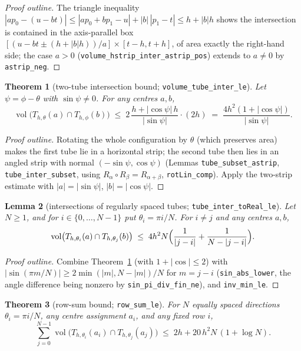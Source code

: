 \documentclass[11pt,a4paper]{article}
\newcommand{\vol}{\operatorname{vol}}                %
\newcommand{\tube}{T}                                %
\newcommand{\lname}[1]{\texttt{#1}}                  %
\newcommand{\lb}{\_\allowbreak}                      %
\newtheorem{theorem}{Theorem}[section]
\newtheorem{lemma}[theorem]{Lemma}
\theoremstyle{definition}
\theoremstyle{remark}
\begin{document}
\begin{proof}[Proof outline]
The triangle inequality $|a p_0-(u-bt)|\le |a p_0 + b p_1 - u| + |b|\,|p_1 - t|
\le h+|b|h$ shows the intersection is contained in the axis-parallel box
$[(u-bt\pm(h+|b|h))/a]\times[t-h,t+h]$, of area exactly the right-hand side; the case
$a>0$ (\lname{volume\_hstrip\_inter\_astrip\_pos}) extends to $a\ne0$ by
\lname{astrip\_neg}.
\end{proof}

\begin{theorem}[{two-tube intersection bound; \lname{volume\_tube\_inter\_le}}]
\label{thm:two-tube}
Let $\psi=\phi-\theta$ with $\sin\psi\neq0$.  For any centres $a,b$,
\[
  \vol\bigl(\tube_{h,\theta}(a)\cap \tube_{h,\phi}(b)\bigr)
  \;\le\; 2\,\frac{h+|\cos\psi|\,h}{|\sin\psi|}\cdot(2h)
  \;=\; \frac{4h^2(1+|\cos\psi|)}{|\sin\psi|}.
\]
\end{theorem}

\begin{proof}[Proof outline]
Rotating the whole configuration by $\theta$ (which preserves area) makes the first tube
lie in a horizontal strip; the second tube then lies in an angled strip with normal
$(-\sin\psi,\cos\psi)$ (Lemmas \lname{tube\_subset\_astrip},
\lname{tube\_inter\_subset}, using $R_\alpha\circ R_\beta = R_{\alpha+\beta}$,
\lname{rotLin\_comp}).  Apply the two-strip estimate with $|a|=|\sin\psi|$,
$|b|=|\cos\psi|$.
\end{proof}

\begin{lemma}[{intersections of regularly spaced tubes; \lname{tube\_inter\_toReal\_le}}]
\label{lem:tube-inter-real}
Let $N\ge1$, and for $i\in\{0,\dots,N-1\}$ put $\theta_i=\pi i/N$.  For $i\neq j$ and any
centres $a,b$,
\[
  \vol\bigl(\tube_{h,\theta_i}(a)\cap \tube_{h,\theta_j}(b)\bigr)
  \;\le\; 4h^2 N\Bigl(\frac{1}{|j-i|}+\frac{1}{N-|j-i|}\Bigr).
\]
\end{lemma}

\begin{proof}[Proof outline]
Combine Theorem~\ref{thm:two-tube} (with $1+|\cos|\le 2$) with
$|\sin(\pi m/N)|\ge 2\min(|m|,N-|m|)/N$ for $m=j-i$
(\lname{sin\_abs\_lower}, the angle difference being nonzero by
\lname{sin\lb pi\lb div\lb fin\lb ne}), and \lname{inv\lb min\lb le}.
\end{proof}

\begin{theorem}[{row-sum bound; \lname{row\_sum\_le}}]
\label{thm:row-sum}
For $N$ equally spaced directions $\theta_i=\pi i/N$, any centre assignment
$a_i$, and any fixed row $i$,
\[
  \sum_{j=0}^{N-1} \vol\bigl(\tube_{h,\theta_i}(a_i)\cap \tube_{h,\theta_j}(a_j)\bigr)
  \;\le\; 2h + 20\,h^{2}N\,(1+\log N).
\]
\end{theorem}
\end{document}
